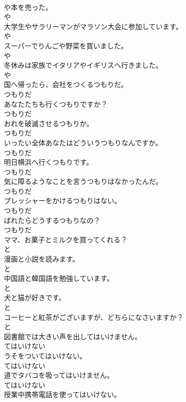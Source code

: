 \documentclass[8pt]{extreport}
\begin{document}
\begin{CJK}{UTF8}{min}
\\	や本を売った。	
\\	や
\\	大学生やサラリーマンがマラソン大会に参加しています。	
\\	や
\\	スーパーでりんごや野菜を買いました。	
\\	や
\\	冬休みは家族でイタリアやイギリスへ行きました。	
\\	や
\\	国へ帰ったら、会社をつくるつもりだ。	
\\	つもりだ
\\	あなたたちも行くつもりですか？	
\\	つもりだ
\\	おれを破滅させるつもりか。	
\\	つもりだ
\\	いったい全体あなたはどういうつもりなんですか。	
\\	つもりだ
\\	明日横浜へ行くつもりです。	
\\	つもりだ
\\	気に障るようなことを言うつもりはなかったんだ。	
\\	つもりだ
\\	プレッシャーをかけるつもりはない。	
\\	つもりだ
\\	ばれたらどうするつもりなの？	
\\	つもりだ
\\	ママ、お菓子とミルクを買ってくれる？	
\\	と
\\	漫画と小説を読みます。	
\\	と
\\	中国語と韓国語を勉強しています。	
\\	と
\\	犬と猫が好きです。	
\\	と
\\	コーヒーと紅茶がございますが、どちらになさいますか？	
\\	と
\\	図書館では大きい声を出してはいけません。	
\\	てはいけない
\\	うそをついてはいけない。	
\\	てはいけない
\\	道でタバコを吸ってはいけません。	
\\	てはいけない
\\	授業中携帯電話を使ってはいけない。	

\end{CJK}
\end{document}
